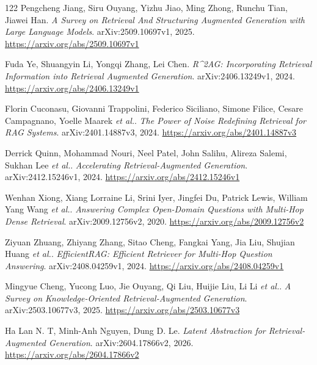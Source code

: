 \documentclass[11pt,a4paper]{article}
\begin{document}
\begin{thebibliography}{122}
Pengcheng Jiang, Siru Ouyang, Yizhu Jiao, Ming Zhong, Runchu Tian, Jiawei Han.
\newblock \emph{A Survey on Retrieval And Structuring Augmented Generation with Large Language Models}.
\newblock arXiv:2509.10697v1, 2025.
\newblock \url{https://arxiv.org/abs/2509.10697v1}

Fuda Ye, Shuangyin Li, Yongqi Zhang, Lei Chen.
\newblock \emph{R\textasciicircum{}2AG: Incorporating Retrieval Information into Retrieval Augmented Generation}.
\newblock arXiv:2406.13249v1, 2024.
\newblock \url{https://arxiv.org/abs/2406.13249v1}

Florin Cuconasu, Giovanni Trappolini, Federico Siciliano, Simone Filice, Cesare Campagnano, Yoelle Maarek \emph{et al.}.
\newblock \emph{The Power of Noise Redefining Retrieval for RAG Systems}.
\newblock arXiv:2401.14887v3, 2024.
\newblock \url{https://arxiv.org/abs/2401.14887v3}

Derrick Quinn, Mohammad Nouri, Neel Patel, John Salihu, Alireza Salemi, Sukhan Lee \emph{et al.}.
\newblock \emph{Accelerating Retrieval-Augmented Generation}.
\newblock arXiv:2412.15246v1, 2024.
\newblock \url{https://arxiv.org/abs/2412.15246v1}

Wenhan Xiong, Xiang Lorraine Li, Srini Iyer, Jingfei Du, Patrick Lewis, William Yang Wang \emph{et al.}.
\newblock \emph{Answering Complex Open-Domain Questions with Multi-Hop Dense Retrieval}.
\newblock arXiv:2009.12756v2, 2020.
\newblock \url{https://arxiv.org/abs/2009.12756v2}

Ziyuan Zhuang, Zhiyang Zhang, Sitao Cheng, Fangkai Yang, Jia Liu, Shujian Huang \emph{et al.}.
\newblock \emph{EfficientRAG: Efficient Retriever for Multi-Hop Question Answering}.
\newblock arXiv:2408.04259v1, 2024.
\newblock \url{https://arxiv.org/abs/2408.04259v1}

Mingyue Cheng, Yucong Luo, Jie Ouyang, Qi Liu, Huijie Liu, Li Li \emph{et al.}.
\newblock \emph{A Survey on Knowledge-Oriented Retrieval-Augmented Generation}.
\newblock arXiv:2503.10677v3, 2025.
\newblock \url{https://arxiv.org/abs/2503.10677v3}

Ha Lan N. T, Minh-Anh Nguyen, Dung D. Le.
\newblock \emph{Latent Abstraction for Retrieval-Augmented Generation}.
\newblock arXiv:2604.17866v2, 2026.
\newblock \url{https://arxiv.org/abs/2604.17866v2}


\end{thebibliography}
\end{document}
